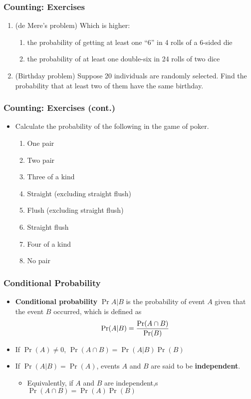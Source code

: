 \documentclass[pdflatex, 12pt]{beamer}
\begin{document}
\begin{frame}
\frametitle{Counting: Exercises}
\begin{enumerate}
\item (de Mere's problem) Which is higher:
 \begin{enumerate}
 \item the probability of getting at least one ``6'' in 4 rolls of a 6-sided die
 \item the probability of at least one double-six in 24 rolls of two dice
 \end{enumerate}
\vspace{0.4cm}
\item (Birthday problem) Suppose 20 individuals are randomly selected. Find the probability that at least two of them have the same birthday. 	
\end{enumerate}
\end{frame}

\begin{frame}
\frametitle{Counting: Exercises (cont.)}
\begin{itemize}
\item Calculate the probability of the following in the game of poker.
 \begin{enumerate}
 \item One pair
 \item Two pair
 \item Three of a kind
 \item Straight (excluding straight flush)
 \item Flush (excluding straight flush)
 \item Straight flush
 \item Four of a kind
 \item No pair
 \end{enumerate}
\end{itemize}
\end{frame}

\begin{frame}
\frametitle{Conditional Probability}
\begin{itemize}
\item \textbf{Conditional probability} $\Pr{A|B}$ is the probability of event $A$ given that the event $B$ occurred, which is defined as 
 \begin{equation}
 \Pr(A|B) = \frac{\Pr(A \cap B)}{\Pr(B)} \notag
 \end{equation}
\vspace{0.2cm}
\item If $\Pr(A) \neq 0$, $\Pr(A \cap B) = \Pr(A|B)\Pr(B)$
\vspace{0.4cm}
\item If $\Pr(A|B) = \Pr(A)$, events $A$ and $B$ are said to be \textbf{independent}.
 \begin{itemize}
 \item Equivalently, if $A$ and $B$ are independent,s $\Pr(A \cap B) = \Pr(A)\Pr(B)$
 \end{itemize}
\end{itemize}
\end{frame}
\end{document}
